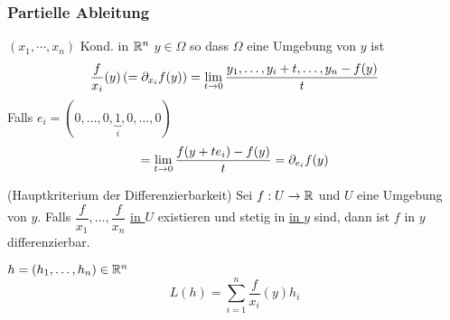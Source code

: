 \subsubsection{Partielle Ableitung}
$(x_1,\cdots,x_n)$ Kond. in $\mathbb{R}^n$ $y\in \Omega$ so dass $\Omega$ eine Umgebung von $y$ ist
\[\dfrac{f}{x_i}(y)\left( =\partial_{x_i}f(y) \right)=\displaystyle\lim_{t\rightarrow0}\frac{y_1,\dots,y_i+t,\dots,y_n-f(y)}{t}\]
Falls $e_i=(0,\dots,0,\underbrace{1}_i,0,\dots,0)$
\[=\displaystyle\lim_{t\rightarrow0}\frac{f(y+te_i)-f(y)}{t}=\partial_{e_i}f(y)\]
\begin{Sat}
  (Hauptkriterium der Differenzierbarkeit) Sei $f:U\rightarrow \mathbb{R}$ und $U$ eine Umgebung von $y$. Falls $\dfrac{f}{x_1},\dots,\dfrac{f}{x_n}$ \ul{in $U$} existieren und stetig in \ul{in $y$} sind, dann ist $f$ in $y$ differenzierbar.
\end{Sat}
\begin{Bew}
  $h=(h_1,\dots,h_n)\in\mathbb{R}^n$
  \[L(h)=\sum^n_{i=1}\dfrac{f}{x_i}(y)h_i\]

\end{Bew}
